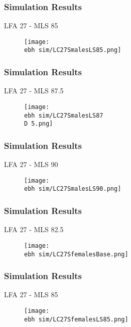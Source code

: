 \documentclass{beamer}
\newcommand{\ebh}{\string~/bio.data/bio.lobster/figures/LFA2733Framework2018/} %
\newcommand{\D}{.}
\begin{document}
\begin{frame}
\frametitle{Simulation Results}
LFA 27 - MLS 85
\begin{figure}
        \begin{center}
            \texttt{[image: \\ebh sim/LC27SmalesLS85.png]}
        \end{center}
    \end{figure}
\end{frame}


\begin{frame}
\frametitle{Simulation Results}
LFA 27 - MLS 87.5
\begin{figure}
        \begin{center}
            \texttt{[image: \\ebh sim/LC27SmalesLS87\\D 5.png]}
        \end{center}
    \end{figure}
\end{frame}


\begin{frame}
\frametitle{Simulation Results}
LFA 27 - MLS 90
\begin{figure}
        \begin{center}
            \texttt{[image: \\ebh sim/LC27SmalesLS90.png]}
        \end{center}
    \end{figure}
\end{frame}




\begin{frame}
\frametitle{Simulation Results}
LFA 27 - MLS 82.5
\begin{figure}
        \begin{center}
            \texttt{[image: \\ebh sim/LC27SfemalesBase.png]}
        \end{center}
    \end{figure}
\end{frame}



\begin{frame}
\frametitle{Simulation Results}
LFA 27 - MLS 85
\begin{figure}
        \begin{center}
            \texttt{[image: \\ebh sim/LC27SfemalesLS85.png]}
        \end{center}
    \end{figure}
\end{frame}
\end{document}
